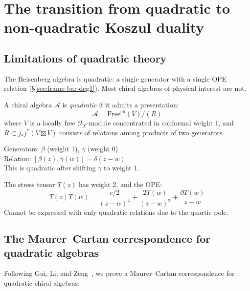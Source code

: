
\section{The transition from quadratic to non-quadratic Koszul duality}

\subsection{Limitations of quadratic theory}

The Heisenberg algebra is quadratic: a single generator with a single OPE relation (\S\ref{sec:frame-bar-deg1}). Most chiral algebras of physical interest are not.

\begin{definition}
A chiral algebra $\mathcal{A}$ is \emph{quadratic} if it admits a presentation:
\[
\mathcal{A} = \text{Free}^{\text{ch}}(V)/(R)
\]
where $V$ is a locally free $\mathcal{O}_X$-module concentrated in conformal weight 1, and $R \subset j_*j^*(V \boxtimes V)$ consists of relations among products of two generators.
\end{definition}

\begin{example}
Generators: $\beta$ (weight 1), $\gamma$ (weight 0) \\
Relation: $[\beta(z), \gamma(w)] = \delta(z-w)$ \\
This is quadratic after shifting $\gamma$ to weight 1.
\end{example}

\begin{example}
The stress tensor $T(z)$ has weight 2, and the OPE:
\[
T(z)T(w) = \frac{c/2}{(z-w)^4} + \frac{2T(w)}{(z-w)^2} + \frac{\partial T(w)}{z-w}
\]
Cannot be expressed with only quadratic relations due to the quartic pole.
\end{example}

\subsection{The Maurer--Cartan correspondence for quadratic algebras}

Following Gui, Li, and Zeng~\cite{GLZ22}, we prove a Maurer--Cartan correspondence for quadratic chiral algebras:

